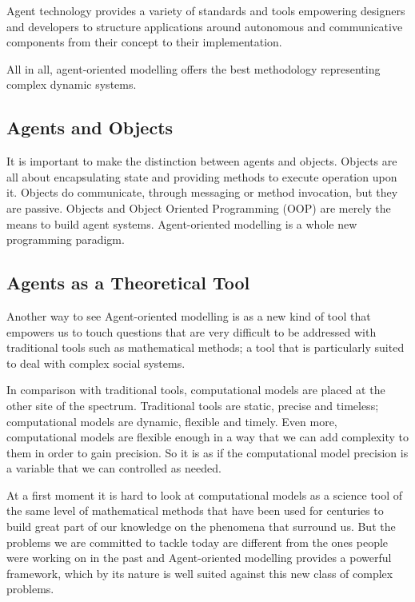 Agent technology provides a variety of standards and tools empowering designers and developers to structure applications around autonomous and communicative components from their concept to their implementation. \cite{al3roadmap}

All in all, agent-oriented modelling offers the best methodology representing complex dynamic systems.

\subsection{Agents and Objects}

It is important to make the distinction between agents and objects. Objects are all about encapsulating state and providing methods to execute operation upon it. Objects do communicate, through messaging or method invocation, but they are passive. Objects and Object Oriented Programming (OOP) are merely the means to build agent systems. Agent-oriented modelling is a whole new programming paradigm. 

\subsection{Agents as a Theoretical Tool}

Another way to see Agent-oriented modelling is as a new kind of tool that empowers us to touch questions that are very difficult to be addressed with traditional tools such as mathematical methods; a tool that is particularly suited to deal with complex social systems.

In comparison with traditional tools, computational models are placed at the other site of the spectrum. Traditional tools are static, precise and timeless; computational models are dynamic, flexible and timely. Even more, computational models are flexible enough in a way that we can add complexity to them in order to gain precision. So it is as if the computational model precision is a variable that we can controlled as needed.

At a first moment it is hard to look at computational models as a science tool of the same level of mathematical methods that have been used for centuries to build great part of our knowledge on the phenomena that surround us. But the problems we are committed to tackle today are different from the ones people were working on in the past and Agent-oriented modelling provides a powerful framework, which by its nature is well suited against this new class of complex problems.

